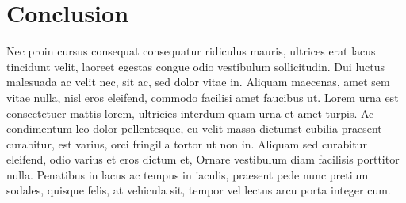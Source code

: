 \documentclass{article}
\begin{document}
\section{Conclusion}
Nec proin cursus consequat consequatur ridiculus mauris, ultrices erat
lacus tincidunt velit, laoreet egestas congue odio vestibulum
sollicitudin. Dui luctus malesuada ac velit nec, sit ac, sed dolor
vitae in.  Aliquam maecenas, amet sem vitae nulla, nisl eros eleifend,
commodo facilisi amet faucibus ut.  Lorem urna est consectetuer mattis
lorem, ultricies interdum quam urna et amet turpis.  Ac condimentum
leo dolor pellentesque, eu velit massa dictumst cubilia praesent
curabitur, est varius, orci fringilla tortor ut non in. Aliquam sed
curabitur eleifend, odio varius et eros dictum et,
Ornare vestibulum diam facilisis porttitor nulla. Penatibus in lacus
ac tempus in iaculis, praesent pede nunc pretium sodales, quisque
felis, at vehicula sit, tempor vel lectus arcu porta integer cum.
\end{document}
